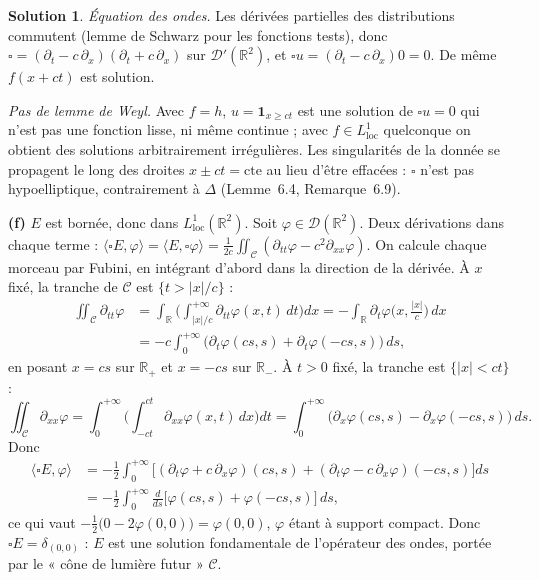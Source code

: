 \documentclass[11pt,a4paper]{article}
\newcommand{\R}{\mathbb{R}}
\newcommand{\D}{\mathcal{D}}
\theoremstyle{definition}
\newtheorem*{solution}{Solution}
\begin{document}
\begin{solution}
\emph{Équation des ondes.} Les dérivées partielles des distributions commutent (lemme de Schwarz pour les fonctions tests), donc $\square=(\partial_t-c\,\partial_x)(\partial_t+c\,\partial_x)$ sur $\D'(\R^2)$, et $\square u=(\partial_t-c\,\partial_x)0=0$. De même $f(x+ct)$ est solution.

\emph{Pas de lemme de Weyl.} Avec $f=h$, $u=\mathbf 1_{x\ge ct}$ est une solution de $\square u=0$ qui n'est pas une fonction lisse, ni même continue ; avec $f\in L^1_{\mathrm{loc}}$ quelconque on obtient des solutions arbitrairement irrégulières. Les singularités de la donnée se propagent le long des droites $x\pm ct=\text{cte}$ au lieu d'être effacées : $\square$ n'est pas hypoelliptique, contrairement à $\Delta$ (Lemme~6.4, Remarque~6.9).

\medskip
\noindent\textbf{(f)} $E$ est bornée, donc dans $L^1_{\mathrm{loc}}(\R^2)$. Soit $\varphi\in\D(\R^2)$. Deux dérivations dans chaque terme : $\langle\square E,\varphi\rangle=\langle E,\square\varphi\rangle=\frac1{2c}\iint_{\mathcal C}(\partial_{tt}\varphi-c^2\partial_{xx}\varphi)$. On calcule chaque morceau par Fubini, en intégrant d'abord dans la direction de la dérivée. À $x$ fixé, la tranche de $\mathcal C$ est $\{t>|x|/c\}$ :
\begin{align*}
\iint_{\mathcal C}\partial_{tt}\varphi&=\int_\R\Big(\int_{|x|/c}^{+\infty}\partial_{tt}\varphi(x,t)\,dt\Big)dx=-\int_\R\partial_t\varphi\big(x,\tfrac{|x|}c\big)\,dx\\
&=-c\int_0^{+\infty}\big(\partial_t\varphi(cs,s)+\partial_t\varphi(-cs,s)\big)\,ds ,
\end{align*}
en posant $x=cs$ sur $\R_+$ et $x=-cs$ sur $\R_-$. À $t>0$ fixé, la tranche est $\{|x|<ct\}$ :
\[
\iint_{\mathcal C}\partial_{xx}\varphi=\int_0^{+\infty}\Big(\int_{-ct}^{ct}\partial_{xx}\varphi(x,t)\,dx\Big)dt=\int_0^{+\infty}\big(\partial_x\varphi(cs,s)-\partial_x\varphi(-cs,s)\big)\,ds .
\]
Donc
\begin{align*}
\langle\square E,\varphi\rangle&=-\frac12\int_0^{+\infty}\Big[(\partial_t\varphi+c\,\partial_x\varphi)(cs,s)+(\partial_t\varphi-c\,\partial_x\varphi)(-cs,s)\Big]ds\\
&=-\frac12\int_0^{+\infty}\frac d{ds}\big[\varphi(cs,s)+\varphi(-cs,s)\big]\,ds ,
\end{align*}
ce qui vaut $-\frac12\big(0-2\varphi(0,0)\big)=\varphi(0,0)$, $\varphi$ étant à support compact. Donc $\square E=\delta_{(0,0)}$ : $E$ est une solution fondamentale de l'opérateur des ondes, portée par le « cône de lumière futur » $\mathcal C$.


\end{solution}
\end{document}
